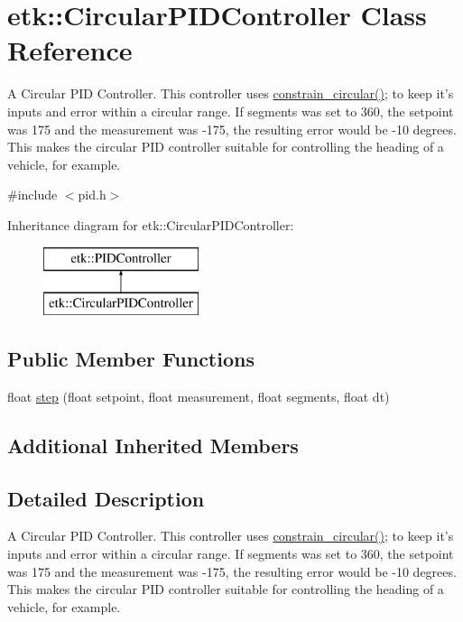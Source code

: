 \hypertarget{classetk_1_1_circular_p_i_d_controller}{\section{etk\-:\-:Circular\-P\-I\-D\-Controller Class Reference}
\label{classetk_1_1_circular_p_i_d_controller}
}


A Circular P\-I\-D Controller. This controller uses \hyperlink{namespaceetk_a0bb96bed2b97ddb4eba560684c0e050a}{constrain\-\_\-circular()}; to keep it's inputs and error within a circular range. If segments was set to 360, the setpoint was 175 and the measurement was -\/175, the resulting error would be -\/10 degrees. This makes the circular P\-I\-D controller suitable for controlling the heading of a vehicle, for example.  




{\ttfamily \#include $<$pid.\-h$>$}

Inheritance diagram for etk\-:\-:Circular\-P\-I\-D\-Controller\-:\begin{figure}[H]
\begin{center}
\leavevmode
\includegraphics[height=2.000000cm]{classetk_1_1_circular_p_i_d_controller}
\end{center}
\end{figure}
\subsection*{Public Member Functions}
\begin{DoxyCompactItemize}
\item 
float \hyperlink{classetk_1_1_circular_p_i_d_controller_acefc7ea3b8ce7fbbf47a696753b48c24}{step} (float setpoint, float measurement, float segments, float dt)
\end{DoxyCompactItemize}
\subsection*{Additional Inherited Members}


\subsection{Detailed Description}
A Circular P\-I\-D Controller. This controller uses \hyperlink{namespaceetk_a0bb96bed2b97ddb4eba560684c0e050a}{constrain\-\_\-circular()}; to keep it's inputs and error within a circular range. If segments was set to 360, the setpoint was 175 and the measurement was -\/175, the resulting error would be -\/10 degrees. This makes the circular P\-I\-D controller suitable for controlling the heading of a vehicle, for example. 

